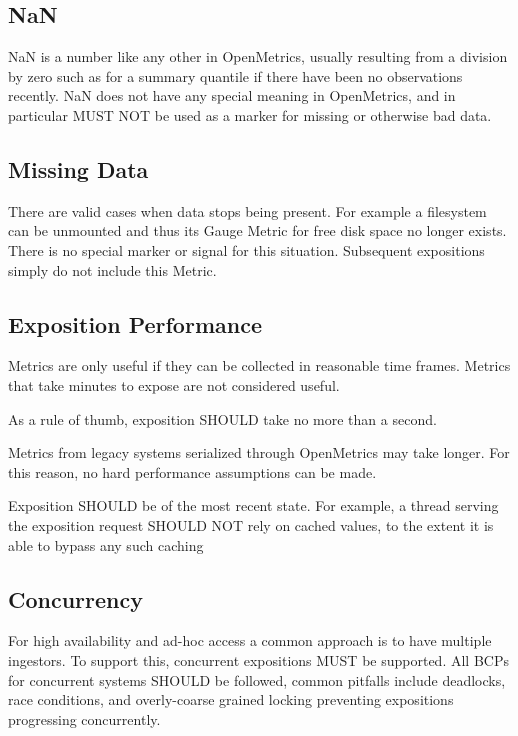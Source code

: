 \documentclass[a4paper,12pt,notitlepage,twoside,openright]{article}
\begin{document}
\hypertarget{nan}{%
\subsection{NaN}\label{nan}}

NaN is a number like any other in OpenMetrics, usually resulting from a
division by zero such as for a summary quantile if there have been no
observations recently. NaN does not have any special meaning in
OpenMetrics, and in particular MUST NOT be used as a marker for missing
or otherwise bad data.

\hypertarget{missing-data}{%
\subsection{Missing Data}\label{missing-data}}

There are valid cases when data stops being present. For example a
filesystem can be unmounted and thus its Gauge Metric for free disk
space no longer exists. There is no special marker or signal for this
situation. Subsequent expositions simply do not include this Metric.

\hypertarget{exposition-performance}{%
\subsection{Exposition Performance}\label{exposition-performance}}

Metrics are only useful if they can be collected in reasonable time
frames. Metrics that take minutes to expose are not considered useful.

As a rule of thumb, exposition SHOULD take no more than a second.

Metrics from legacy systems serialized through OpenMetrics may take
longer. For this reason, no hard performance assumptions can be made.

Exposition SHOULD be of the most recent state. For example, a thread
serving the exposition request SHOULD NOT rely on cached values, to the
extent it is able to bypass any such caching

\hypertarget{concurrency}{%
\subsection{Concurrency}\label{concurrency}}

For high availability and ad-hoc access a common approach is to have
multiple ingestors. To support this, concurrent expositions MUST be
supported. All BCPs for concurrent systems SHOULD be followed, common
pitfalls include deadlocks, race conditions, and overly-coarse grained
locking preventing expositions progressing concurrently.
\end{document}
